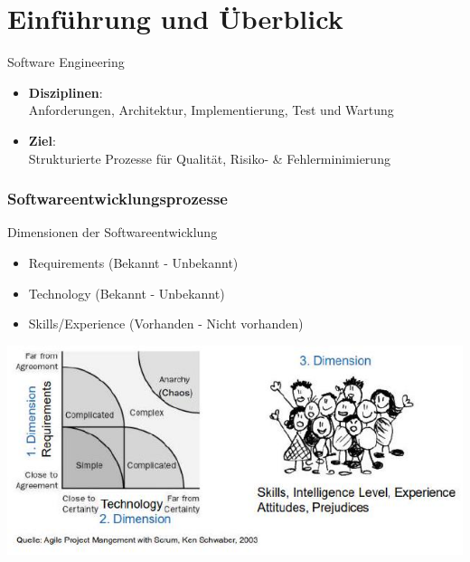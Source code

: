 \section{Einführung und Überblick}

\begin{definition}{Software Engineering}
    \begin{itemize}
        \item \textbf{Disziplinen}: \\
        Anforderungen, Architektur, Implementierung, Test und Wartung
        \item \textbf{Ziel}: \\
        Strukturierte Prozesse für Qualität, Risiko- \& Fehlerminimierung
    \end{itemize}
    \end{definition}


\subsubsection{Softwareentwicklungsprozesse}

\begin{concept}{Dimensionen der Softwareentwicklung}
\begin{itemize}
    \item Requirements (Bekannt - Unbekannt)
    \item Technology (Bekannt - Unbekannt)  
    \item Skills/Experience (Vorhanden - Nicht vorhanden)
\end{itemize}
\includegraphics[width=\linewidth]{images/2024_12_29_0d1d7b5551ea1b4b41bdg-01}
\end{concept}



